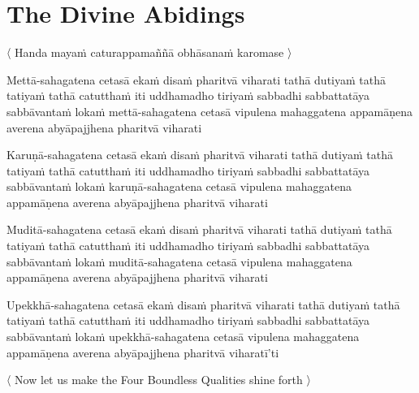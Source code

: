 \suttaRef{[AN 3.65 \& 5.57]}


\section{The Divine Abidings}
\label{divine-abidings}

\begin{leader}
  〈 Handa mayaṁ caturappamaññā obhāsanaṁ karomase 〉
\end{leader}

\begin{pali-hang}
Mettā-sahagatena cetasā ekaṁ disaṁ pharitvā viharati tathā dutiyaṁ tathā tatiyaṁ tathā catutthaṁ iti uddhamadho tiriyaṁ sabbadhi sabbattatāya sabbāvantaṁ lokaṁ mettā-sahagatena cetasā vipulena mahaggatena appamāṇena averena abyāpajjhena pharitvā viharati
\end{pali-hang}

\medskip

\begin{pali-hang}
Karuṇā-sahagatena cetasā ekaṁ disaṁ pharitvā viharati tathā dutiyaṁ tathā tatiyaṁ tathā catutthaṁ iti uddhamadho tiriyaṁ sabbadhi sabbattatāya sabbāvantaṁ lokaṁ karuṇā-sahagatena cetasā vipulena mahaggatena appamāṇena averena abyāpajjhena pharitvā viharati
\end{pali-hang}

\medskip

\begin{pali-hang}
Muditā-sahagatena cetasā ekaṁ disaṁ pharitvā viharati tathā dutiyaṁ tathā tatiyaṁ tathā catutthaṁ iti uddhamadho tiriyaṁ sabbadhi sabbattatāya sabbāvantaṁ lokaṁ muditā-sahagatena cetasā vipulena mahaggatena appamāṇena averena abyāpajjhena pharitvā viharati
\end{pali-hang}

\medskip

\begin{pali-hang}
Upekkhā-sahagatena cetasā ekaṁ disaṁ pharitvā viharati tathā dutiyaṁ tathā tatiyaṁ tathā catutthaṁ iti uddhamadho tiriyaṁ sabbadhi sabbattatāya sabbāvantaṁ lokaṁ upekkhā-sahagatena cetasā vipulena mahaggatena appamāṇena averena abyāpajjhena pharitvā viharatī'ti
\end{pali-hang}

\clearpage

\begin{leader-english}
  〈 Now let us make the Four Boundless Qualities shine forth 〉
\end{leader-english}

